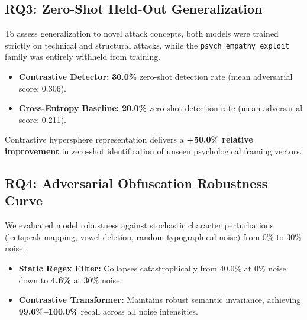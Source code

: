 \documentclass[journal]{IEEEtran}
\begin{document}
\subsection{RQ3: Zero-Shot Held-Out Generalization}
To assess generalization to novel attack concepts, both models were trained strictly on technical and structural attacks, while the \texttt{psych\_empathy\_exploit} family was entirely withheld from training.
\begin{itemize}
    \item \textbf{Contrastive Detector:} \textbf{30.0\%} zero-shot detection rate (mean adversarial score: 0.306).
    \item \textbf{Cross-Entropy Baseline:} \textbf{20.0\%} zero-shot detection rate (mean adversarial score: 0.211).
\end{itemize}
Contrastive hypersphere representation delivers a \textbf{+50.0\% relative improvement} in zero-shot identification of unseen psychological framing vectors.

\subsection{RQ4: Adversarial Obfuscation Robustness Curve}
We evaluated model robustness against stochastic character perturbations (leetspeak mapping, vowel deletion, random typographical noise) from 0\% to 30\% noise:
\begin{itemize}
    \item \textbf{Static Regex Filter:} Collapses catastrophically from 40.0\% at 0\% noise down to \textbf{4.6\%} at 30\% noise.
    \item \textbf{Contrastive Transformer:} Maintains robust semantic invariance, achieving \textbf{99.6\%--100.0\%} recall across all noise intensities.
\end{itemize}

\begin{table}[t]
\caption{Ablation Study: Critical Impact of Benign Emotional Hard-Negatives}
\label{tab:ablation}
\centering
{}
\end{table}
\end{document}
